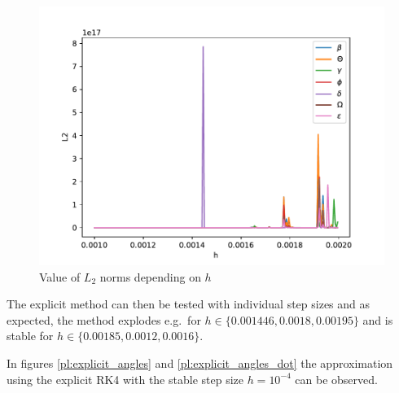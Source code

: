 \documentclass{report}
\begin{document}
\begin{figure}[h]
\centering
\begin{minipage}[t]{0.7\textwidth}
\centering
\includegraphics[width=\textwidth]{../Plots/RK4_Proj2/L2_norm_different_k.pdf}
\caption{Value of $L_2$ norms depending on $h$}
\label{pl:L2_norm_explicit}
\end{minipage}
\end{figure}


The explicit method can then be tested with individual step sizes and as expected, the method explodes e.g.\ for $h \in \{0.001446, 0.0018, 0.00195\}$ and is stable for $h \in \{0.00185, 0.0012, 0.0016\}$.

In figures \ref{pl:explicit_angles}  and \ref{pl:explicit_angles_dot} the approximation using the explicit RK4 with the stable step size $h=10^{-4}$ can be observed.
\end{document}
